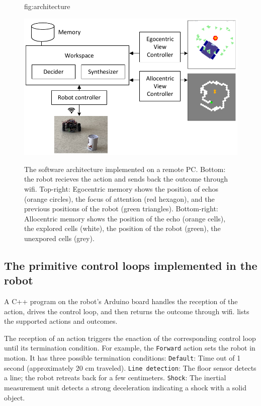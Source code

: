 \documentclass[pmlr]{jmlr}%
\begin{document}
\begin{figure}[htbp]
	\floatconts
	{fig:architecture}
	{\caption{The software architecture implemented on a remote PC. 
			Bottom: the robot recieves the action and sends back the outcome through wifi.
			Top-right: Egocentric memory shows the position of echos (orange circles), the focus of attention (red hexagon), and the previous positions of the robot (green triangles).
			Bottom-right: Allocentric memory shows the position of the echo (orange cells), the explored cells (white), the position of the robot (green), the unexpored cells (grey).}}
	{\includegraphics[width=0.8\linewidth]{images/Figure_2_Architecture}}
\end{figure}


\subsection{The primitive control loops implemented in the robot}

A C++ program on the robot's Arduino board handles the reception of the action, drives the control loop, and then returns the outcome through wifi. 
 lists the supported actions and outcomes.

The reception of an action triggers the enaction of the corresponding control loop until its termination condition.
For example, the \texttt{Forward} action sets the robot in motion. 
It has three possible termination conditions: 
\texttt{Default}: Time out of 1 second (approximately 20 cm traveled).
\texttt{Line detection}: The floor sensor detects a line; the robot retreats back for a few centimeters. 
\texttt{Shock}: The inertial measurement unit detects a strong deceleration indicating a shock with a solid object.
\end{document}
